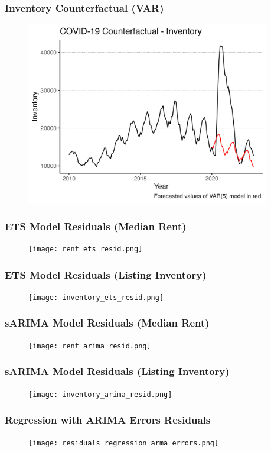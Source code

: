 \documentclass[t]{beamer}
\begin{document}
\begin{frame}
\frametitle{Inventory Counterfactual (VAR)}
\begin{figure}
\includegraphics[width=4.2in]{inventory_counterfactual.png}
\end{figure}
\end{frame}

\begin{frame}
\frametitle{ETS Model Residuals (Median Rent)}
\begin{figure}
\texttt{[image: rent\_ets\_resid.png]}
\end{figure}
\end{frame}

\begin{frame}
\frametitle{ETS Model Residuals (Listing Inventory)}
\begin{figure}
\texttt{[image: inventory\_ets\_resid.png]}
\end{figure}
\end{frame}

\begin{frame}
\frametitle{sARIMA Model Residuals (Median Rent)}
\begin{figure}
\texttt{[image: rent\_arima\_resid.png]}
\end{figure}
\end{frame}

\begin{frame}
\frametitle{sARIMA Model Residuals (Listing Inventory)}
\begin{figure}
\texttt{[image: inventory\_arima\_resid.png]}
\end{figure}
\end{frame}

\begin{frame}
\frametitle{Regression with ARIMA Errors Residuals}
\begin{figure}
\texttt{[image: residuals\_regression\_arma\_errors.png]}
\end{figure}
\end{frame}
\end{document}
